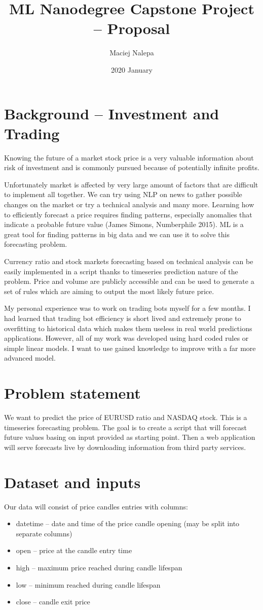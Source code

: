 \documentclass[a4paper,12pt]{article}
\title{ML Nanodegree Capstone Project -- Proposal}
\author{Maciej Nalepa}
\date{2020 January}
\begin{document}
\maketitle

\section{Background -- Investment and Trading}
Knowing the future of a market stock price is a very valuable information about risk of investment and is commonly pursued because of potentially infinite profits.

Unfortunately market is affected by very large amount of factors that are difficult to implement all together. We can try using NLP on news to gather possible changes on the market or try a technical analysis and many more. Learning how to efficiently forecast a price requires finding patterns, especially anomalies that indicate a probable future value (James Simons, Numberphile 2015). ML is a great tool for finding patterns in big data and we can use it to solve this forecasting problem.

Currency ratio and stock markets forecasting based on technical analysis can be easily implemented in a script thanks to timeseries prediction nature of the problem. Price and volume are publicly accessible and can be used to generate a set of rules which are aiming to output the most likely future price.

My personal experience was to work on trading bots myself for a few months. I had learned that trading bot efficiency is short lived and extremely prone to overfitting to historical data which makes them useless in real world predictions applications. However, all of my work was developed using hard coded rules or simple linear models. I want to use gained knowledge to improve with a far more advanced model.

\section{Problem statement}
We want to predict the price of EURUSD ratio and NASDAQ stock. This is a timeseries forecasting problem. The goal is to create a script that will forecast future values basing on input provided as starting point. Then a web application will serve forecasts live by downloading information from third party services.

\section{Dataset and inputs}
Our data will consist of price candles entries with columns:
\begin{itemize}
\item datetime -- date and time of the price candle opening (may be split into separate columns)
\item open -- price at the candle entry time
\item high -- maximum price reached during candle lifespan
\item low -- minimum reached during candle lifespan
\item close -- candle exit price
\end{itemize}
\end{document}
